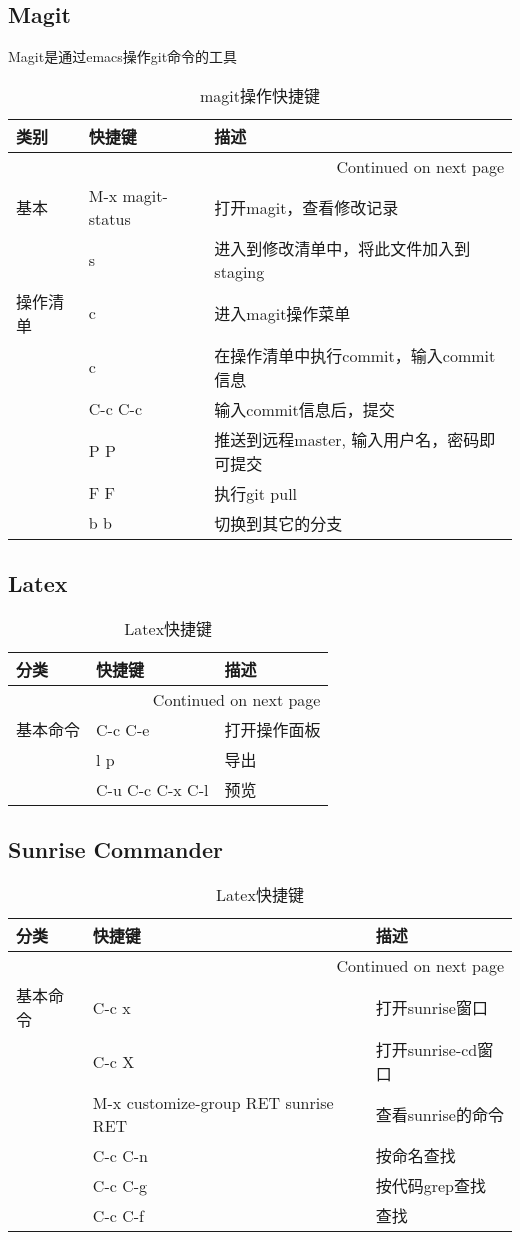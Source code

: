 \documentclass[10pt,a4paper]{article}
\begin{document}
\subsection{Magit}
\label{sec-3-11}
Magit是通过emacs操作git命令的工具
\begin{longtable}{l|l|l}
\caption{magit操作快捷键}
\\
类别 & 快捷键 & 描述\\
\hline
\endhead
\hline\multicolumn{3}{r}{Continued on next page} \\
\endfoot
\endlastfoot
基本 & M-x magit-status & 打开magit，查看修改记录\\
 & s & 进入到修改清单中，将此文件加入到staging\\
操作清单 & c & 进入magit操作菜单\\
 & c & 在操作清单中执行commit，输入commit信息\\
 & C-c C-c & 输入commit信息后，提交\\
 & P P & 推送到远程master, 输入用户名，密码即可提交\\
 & F F & 执行git pull\\
 & b b & 切换到其它的分支\\
\end{longtable}
\subsection{Latex}
\label{sec-3-12}
\begin{longtable}{l|l|l}
\caption{Latex快捷键}
\\
分类 & 快捷键 & 描述\\
\hline
\endhead
\hline\multicolumn{3}{r}{Continued on next page} \\
\endfoot
\endlastfoot
基本命令 & C-c C-e & 打开操作面板\\
 & l p & 导出\\
 & C-u C-c C-x C-l & 预览\\
\end{longtable}
\subsection{Sunrise Commander}
\label{sec-3-13}
\begin{longtable}{l|l|l}
\caption{Latex快捷键}
\\
分类 & 快捷键 & 描述\\
\hline
\endhead
\hline\multicolumn{3}{r}{Continued on next page} \\
\endfoot
\endlastfoot
基本命令 & C-c x & 打开sunrise窗口\\
 & C-c X & 打开sunrise-cd窗口\\
 & M-x customize-group RET sunrise RET & 查看sunrise的命令\\
 & C-c C-n & 按命名查找\\
 & C-c C-g & 按代码grep查找\\
 & C-c C-f & 查找\\
\end{longtable}
\end{document}
